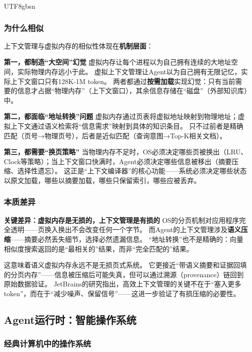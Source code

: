 \documentclass[11pt,a4paper]{article}
\begin{document}
\begin{CJK*}{UTF8}{gbsn}
\subsubsection{为什么相似}

上下文管理与虚拟内存的相似性体现在\textbf{机制层面}：

\textbf{第一，都制造``大空间''幻觉}
虚拟内存让每个进程以为自己拥有连续的大地址空间，实际物理内存远小于此。
虚拟上下文管理让Agent以为自己拥有无限记忆，实际上下文窗口只有128K-1M token。
两者都通过\textbf{按需加载}实现幻觉：只有当前需要的信息才占据``物理内存''（上下文窗口），其余信息存储在``磁盘''（外部知识库）中。

\textbf{第二，都面临``地址转换''问题}
虚拟内存通过页表将虚拟地址映射到物理地址；虚拟上下文通过语义检索将``信息需求''映射到具体的知识条目。
只不过前者是精确匹配（页号→物理页号），后者是近似匹配（查询意图→Top-K相关文档）。

\textbf{第三，都需要``换页策略''}
当物理内存不足时，OS必须决定哪些页被换出（LRU、Clock等策略）；当上下文窗口快满时，Agent必须决定哪些信息被移出（摘要压缩、选择性遗忘）。
这正是``上下文编译器''的核心功能——系统必须决定哪些状态以原文加载，哪些以摘要加载，哪些只保留索引，哪些应被丢弃\cite{contextcompiler2025}。

\subsubsection{本质差异}

\textbf{关键差异：虚拟内存是\textbf{无损}的，上下文管理是\textbf{有损}的}
OS的分页机制对应用程序完全透明——页换入换出不会改变任何一个字节。
而Agent的上下文管理涉及\textbf{语义压缩}——摘要必然丢失细节，选择必然遗漏信息。
``地址转换''也不是精确的：向量相似度搜索返回的是``最相关的''结果，而非``完全匹配的''结果。

这意味着语义虚拟内存永远不是无损页式系统。
它更接近``带语义摘要和证据回填的分页内存''——信息被压缩后可能失真，但可以通过溯源（provenance）链回到原始数据验证。
JetBrains的研究指出，高效上下文管理的关键不在于``塞入更多token''，而在于``减少噪声、保留信号''\cite{jetbrains2025context}——这进一步验证了有损压缩的必要性。

\subsection{Agent运行时：智能操作系统}
\label{sec:agent}

\subsubsection{经典计算机中的操作系统}


\end{CJK*}
\end{document}

